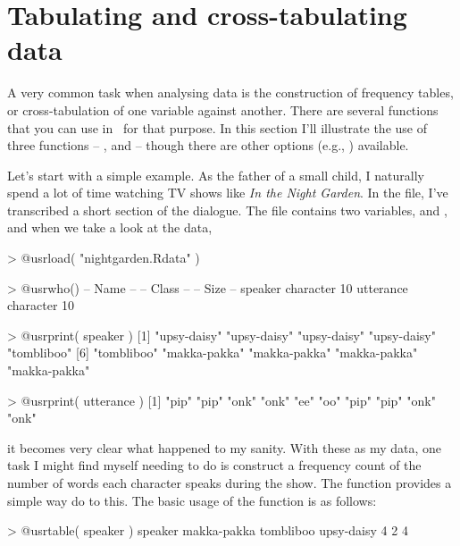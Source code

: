 



\section{Tabulating and cross-tabulating data\label{sec:freqtables}}

A very common task when analysing data is the construction of frequency tables, or cross-tabulation of one variable against another. There are several functions that you can use in \R\ for that purpose. In this section I'll illustrate the use of three functions -- ,  and  -- though there are other options (e.g., ) available. 


Let's start with a simple example. As the father of a small child, I naturally spend a lot of time watching TV shows like {\it In the Night Garden}. In the  file, I've transcribed a short section of the dialogue. The file contains two variables,  and , and when we take a look at the data,
\begin{rblock1}
> @usr{load( "nightgarden.Rdata" )}

> @usr{who()}
   -- Name --   -- Class --   -- Size --
   speaker      character     10        
   utterance    character     10        

> @usr{print( speaker )}
 [1] "upsy-daisy"  "upsy-daisy"  "upsy-daisy"  "upsy-daisy"  "tombliboo"  
 [6] "tombliboo"   "makka-pakka" "makka-pakka" "makka-pakka" "makka-pakka"

> @usr{print( utterance )}
 [1] "pip" "pip" "onk" "onk" "ee"  "oo"  "pip" "pip" "onk" "onk"
\end{rblock1}
it becomes very clear what happened to my sanity. With these as my data, one task I might find myself needing to do is construct a frequency count of the number of words each character speaks during the show. The  function provides a simple way do to this. The basic usage of the  function is as follows:
\begin{rblock1}
> @usr{table( speaker )}
speaker
makka-pakka   tombliboo  upsy-daisy 
          4           2           4 
\end{rblock1}
